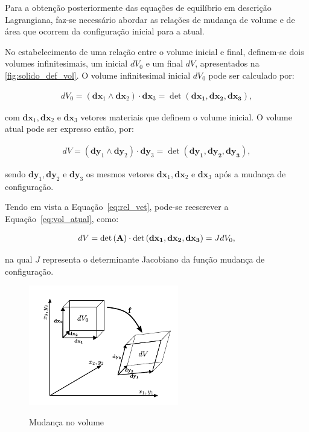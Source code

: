 Para a obtenção posteriormente das equações de equilíbrio em descrição Lagrangiana, faz-se necessário abordar as relações de mudança de volume e de área que ocorrem da configuração inicial para a atual. 

No estabelecimento de uma relação entre o volume inicial e final, definem-se dois volumes infinitesimais, um inicial $dV_{0}$ e um final $dV$, apresentados na \autoref{fig:solido_def_vol}. O volume infinitesimal inicial $dV_{0}$ pode ser calculado por:

\begin{align}
	dV_{0} = (\mathbf{dx}_{1} \wedge \mathbf{dx}_{2}) \cdot \mathbf{dx}_{3} = \det{(\mathbf{dx_1},\mathbf{dx_2},\mathbf{dx_3})},
\end{align}

\noindent com $\mathbf{dx}_1,\mathbf{dx}_2$ e $\mathbf{dx}_3$ vetores materiais que definem o volume inicial. O volume atual pode ser expresso então, por:

\begin{align}
	dV = (\mathbf{dy}_{1} \wedge \mathbf{dy}_{2}) \cdot \mathbf{dy}_{3} = \det{(\mathbf{dy_1},\mathbf{dy_2},\mathbf{dy_3})}, \label{eq:vol_atual}
\end{align}

\noindent  sendo $\mathbf{dy}_1,\mathbf{dy}_2$ e $\mathbf{dy}_3$ os mesmos vetores $\mathbf{dx}_1,\mathbf{dx}_2$ e $\mathbf{dx}_3$ após a mudança de configuração.

Tendo em vista a Equação~\eqref{eq:rel_vet}, pode-se reescrever a Equação~\eqref{eq:vol_atual}, como:

\begin{align}
	dV = \det{\left(\mathbf{A}\right)} \cdot \det{(\mathbf{dx_1},\mathbf{dx_2},\mathbf{dx_3})}  = JdV_{0} \label {eq:vol_atual2},
\end{align}

\noindent na qual $J$ representa o determinante Jacobiano da função mudança de configuração.

\begin{figure}[!htbp]
	\caption{Mudança no volume}
	\centering
	\includegraphics[scale=2.0]{Imagens/Cap4/sol_def_vol.pdf}	
	\label{fig:solido_def_vol}
\end{figure}

